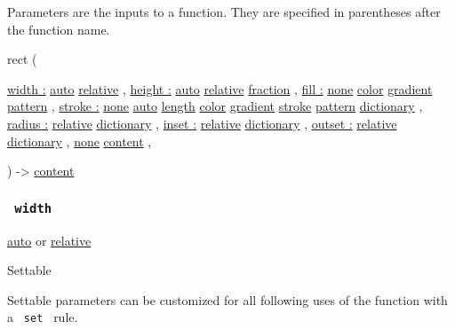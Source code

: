 \label{parameters-tooltip}
Parameters are the inputs to a function. They are specified in
parentheses after the function name.

{ rect } (

{ \hyperref[parameters-width]{width :}
\href{/docs/reference/foundations/auto/}{auto}
\href{/docs/reference/layout/relative/}{relative} , } {
\hyperref[parameters-height]{height :}
\href{/docs/reference/foundations/auto/}{auto}
\href{/docs/reference/layout/relative/}{relative}
\href{/docs/reference/layout/fraction/}{fraction} , } {
\hyperref[parameters-fill]{fill :}
\href{/docs/reference/foundations/none/}{none}
\href{/docs/reference/visualize/color/}{color}
\href{/docs/reference/visualize/gradient/}{gradient}
\href{/docs/reference/visualize/pattern/}{pattern} , } {
\hyperref[parameters-stroke]{stroke :}
\href{/docs/reference/foundations/none/}{none}
\href{/docs/reference/foundations/auto/}{auto}
\href{/docs/reference/layout/length/}{length}
\href{/docs/reference/visualize/color/}{color}
\href{/docs/reference/visualize/gradient/}{gradient}
\href{/docs/reference/visualize/stroke/}{stroke}
\href{/docs/reference/visualize/pattern/}{pattern}
\href{/docs/reference/foundations/dictionary/}{dictionary} , } {
\hyperref[parameters-radius]{radius :}
\href{/docs/reference/layout/relative/}{relative}
\href{/docs/reference/foundations/dictionary/}{dictionary} , } {
\hyperref[parameters-inset]{inset :}
\href{/docs/reference/layout/relative/}{relative}
\href{/docs/reference/foundations/dictionary/}{dictionary} , } {
\hyperref[parameters-outset]{outset :}
\href{/docs/reference/layout/relative/}{relative}
\href{/docs/reference/foundations/dictionary/}{dictionary} , } {
\hyperref[parameters-body]{}
\href{/docs/reference/foundations/none/}{none}
\href{/docs/reference/foundations/content/}{content} , }

) -\textgreater{} \href{/docs/reference/foundations/content/}{content}

\subsubsection{\texorpdfstring{\texttt{\ width\ }}{ width }}\label{parameters-width}

\href{/docs/reference/foundations/auto/}{auto} {or}
\href{/docs/reference/layout/relative/}{relative}

{{ Settable }}

\label{parameters-width-settable-tooltip}
Settable parameters can be customized for all following uses of the
function with a \texttt{\ set\ } rule.


